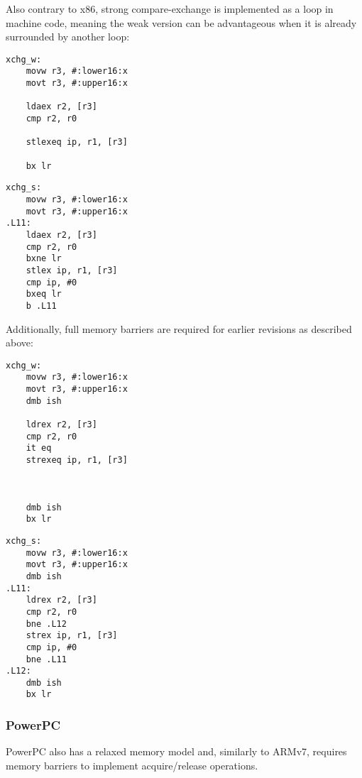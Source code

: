 Also contrary to x86, strong compare-exchange is implemented as a loop in
machine code, meaning the weak version can be advantageous when it is already
surrounded by another loop:

\begin{multicols}{2}
    \begin{lstlisting}[style=arm]
xchg_w:
    movw r3, #:lower16:x
    movt r3, #:upper16:x

    ldaex r2, [r3]
    cmp r2, r0

    stlexeq ip, r1, [r3]

    bx lr
    \end{lstlisting}
    \columnbreak
    \begin{lstlisting}[style=arm]
xchg_s:
    movw r3, #:lower16:x
    movt r3, #:upper16:x
.L11:
    ldaex r2, [r3]
    cmp r2, r0
    bxne lr
    stlex ip, r1, [r3]
    cmp ip, #0
    bxeq lr
    b .L11
    \end{lstlisting}
\end{multicols}

Additionally, full memory barriers are required for earlier revisions as
described above:

\begin{multicols}{2}
    \begin{lstlisting}[style=arm]
xchg_w:
    movw r3, #:lower16:x
    movt r3, #:upper16:x
    dmb ish

    ldrex r2, [r3]
    cmp r2, r0
    it eq
    strexeq ip, r1, [r3]



    dmb ish
    bx lr
    \end{lstlisting}
    \columnbreak
    \begin{lstlisting}[style=arm]
xchg_s:
    movw r3, #:lower16:x
    movt r3, #:upper16:x
    dmb ish
.L11:
    ldrex r2, [r3]
    cmp r2, r0
    bne .L12
    strex ip, r1, [r3]
    cmp ip, #0
    bne .L11
.L12:
    dmb ish
    bx lr
    \end{lstlisting}
\end{multicols}

\subsubsection{PowerPC}

PowerPC also has a relaxed memory model and, similarly to ARMv7, requires memory
barriers to implement acquire/release operations.

